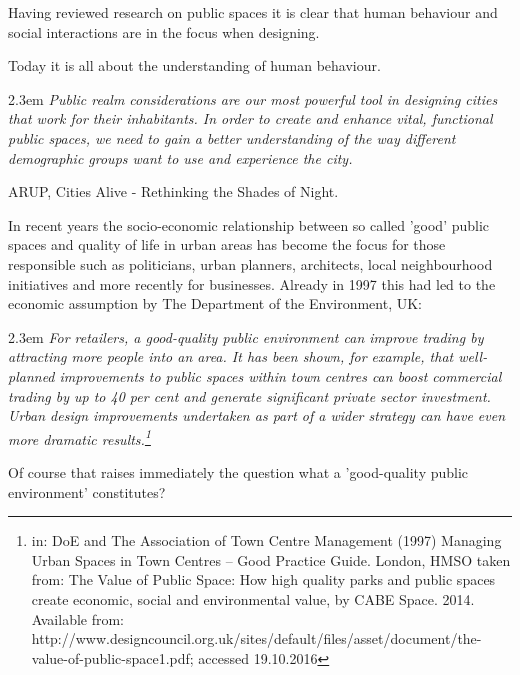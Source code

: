 
Having reviewed research on public spaces it is clear that human behaviour and social interactions are in the focus when designing.


Today it is all about the understanding of human behaviour.


\begin{singlespace}
	\leftskip2.3em
		\rightskip\leftskip
			\textit{\small Public realm considerations are our most powerful tool in designing cities that work for their inhabitants. In order to create and enhance vital, functional public spaces, we need to gain a better understanding of the way different demographic groups want to use and experience the city.}
	
    \small ARUP, Cities Alive - Rethinking the Shades of Night.\\
\end{singlespace}


In recent years the socio-economic relationship between so called 'good' public spaces and quality of life in urban areas has become the focus for those responsible such as politicians, urban planners, architects, local neighbourhood initiatives and more recently for businesses.  
Already in 1997 this had led to the economic assumption by The Department of the Environment, UK:

\begin{singlespace}
	\leftskip2.3em
		\rightskip\leftskip
			\textit{\small For retailers, a good-quality public environment can improve trading by attracting more people into an area. It has been shown, for example, that well-planned improvements to public spaces within town centres can boost commercial trading by up to 40 per cent and generate significant private sector investment. Urban design improvements undertaken as part of a wider strategy can have even more dramatic results.\footnote{in: DoE and The Association of Town Centre
Management (1997) Managing Urban Spaces in Town Centres – Good Practice Guide. London, HMSO taken from: The Value of Public Space: How high quality parks and public spaces create economic, social and environmental value, by CABE Space. 2014. Available from: http://www.designcouncil.org.uk/sites/default/files/asset/document/the-value-of-public-space1.pdf; accessed 19.10.2016}}
\end{singlespace}

Of course that raises immediately the question what a 'good-quality public environment' constitutes?

